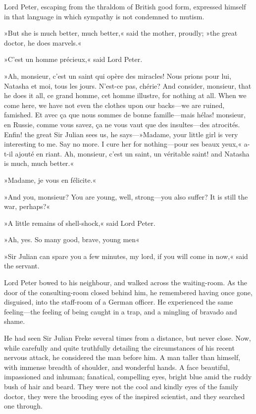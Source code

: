 Lord Peter, escaping from the thraldom of British good form, expressed himself in that language in which sympathy is not condemned to mutism.

»But she is much better, much better,« said the mother, proudly; »the great doctor, he does marvels.«

»C'est un homme précieux,« said Lord Peter.

»Ah, monsieur, c'est un saint qui opère des miracles! Nous prions pour lui, Natasha et moi, tous les jours. N'est-ce pas, chérie? And consider, monsieur, that he does it all, ce grand homme, cet homme illustre, for nothing at all. When we come here, we have not even the clothes upon our backs\allowbreak---\allowbreak we are ruined, famished. Et avec ça que nous sommes de bonne famille\allowbreak---\allowbreak mais hélas! monsieur, en Russie, comme vous savez, ça ne vous vaut que des insultes\allowbreak---\allowbreak des atrocités. Enfin! the great Sir Julian sees us, he says---»Madame, your little girl is very interesting to me. Say no more. I cure her for nothing\allowbreak---\allowbreak pour ses beaux yeux,« a-t-il ajouté en riant. Ah, monsieur, c'est un saint, un véritable saint! and Natasha is much, much better.«

»Madame, je vous en félicite.«

»And you, monsieur? You are young, well, strong\allowbreak---\allowbreak you also suffer? It is still the war, perhaps?«

»A little remains of shell-shock,« said Lord Peter.

»Ah, yes. So many good, brave, young men\longdash«

»Sir Julian can spare you a few minutes, my lord, if you will come in now,« said the servant.

Lord Peter bowed to his neighbour, and walked across the waiting-room. As the door of the consulting-room closed behind him, he remembered having once gone, disguised, into the staff-room of a German officer. He experienced the same feeling\allowbreak---\allowbreak the feeling of being caught in a trap, and a mingling of bravado and shame.

He had seen Sir Julian Freke several times from a distance, but never close. Now, while carefully and quite truthfully detailing the circumstances of his recent nervous attack, he considered the man before him. A man taller than himself, with immense breadth of shoulder, and wonderful hands. A face beautiful, impassioned and inhuman; fanatical, compelling eyes, bright blue amid the ruddy bush of hair and beard. They were not the cool and kindly eyes of the family doctor, they were the brooding eyes of the inspired scientist, and they searched one through.

